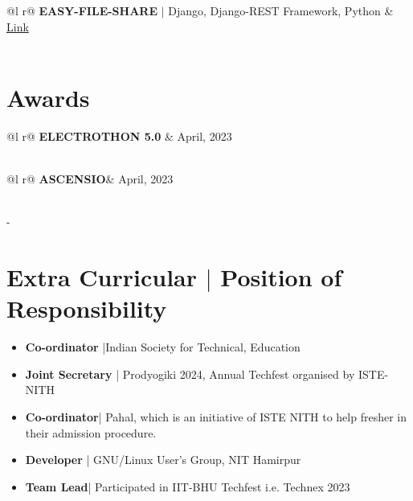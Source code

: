 \documentclass[legalpaper,11pt]{article}
\begin{document}
\begin{tabularx}{\linewidth}{ @{}l r@{} }
\textbf{EASY-FILE-SHARE} $|$ Django, Django-REST Framework, Python & \hfill \href{https://github.com/swastkk/Easy-File-Share}{Link} \\[3.75pt]
  \\
\end{tabularx}

\section{Awards}
\begin{tabularx}{\linewidth}{ @{}l r@{} }
\textbf{ELECTROTHON 5.0} & \hfill April, 2023 \\
 \\
\end{tabularx}
\begin{tabularx}{\linewidth}{ @{}l r@{} }
\textbf{ASCENSIO}& \hfill April, 2023 \\
 \\
\end{tabularx}
-

\section{Extra Curricular $|$ \normalsize{Position of Responsibility}}
\begin{itemize}[leftmargin=*]
    \item \textbf{Co-ordinator} |Indian Society for Technical, Education
    \item \textbf{Joint Secretary} | Prodyogiki 2024, Annual Techfest organised by ISTE-NITH
    \item \textbf{Co-ordinator}| Pahal, which is an initiative of ISTE NITH to help fresher in their admission procedure.
    \item \textbf {Developer} | GNU/Linux User's Group, NIT Hamirpur
    \item \textbf {Team Lead}| Participated in IIT-BHU Techfest i.e. Technex 2023

\end{itemize}
\end{document}
